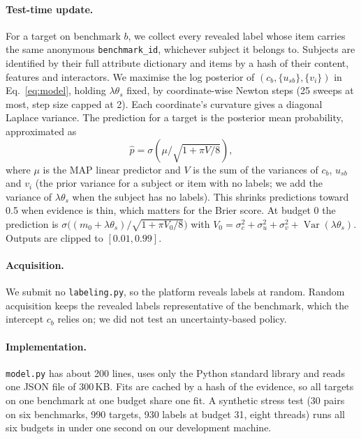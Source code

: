 \documentclass{article}
\begin{document}
\paragraph{Test-time update.} For a target on benchmark $b$, we collect every revealed label whose item carries the same anonymous \texttt{benchmark\_id}, whichever subject it belongs to. Subjects are identified by their full attribute dictionary and items by a hash of their content, features and interactors. We maximise the log posterior of $(c_b, \{u_{sb}\}, \{v_i\})$ in Eq.~\ref{eq:model}, holding $\lambda\theta_s$ fixed, by coordinate-wise Newton steps (25 sweeps at most, step size capped at 2). Each coordinate's curvature gives a diagonal Laplace variance. The prediction for a target is the posterior mean probability, approximated as
\begin{equation}
  \hat p = \sigma\!\left(\mu \big/ \sqrt{1 + \pi V/8}\right),
\end{equation}
where $\mu$ is the MAP linear predictor and $V$ is the sum of the variances of $c_b$, $u_{sb}$ and $v_i$ (the prior variance for a subject or item with no labels; we add the variance of $\lambda\theta_s$ when the subject has no labels). This shrinks predictions toward 0.5 when evidence is thin, which matters for the Brier score. At budget 0 the prediction is $\sigma\big((m_0 + \lambda\theta_s)/\sqrt{1+\pi V_0/8}\big)$ with $V_0 = \sigma_c^2 + \sigma_u^2 + \sigma_v^2 + \operatorname{Var}(\lambda\theta_s)$. Outputs are clipped to $[0.01, 0.99]$.

\paragraph{Acquisition.} We submit no \texttt{labeling.py}, so the platform reveals labels at random. Random acquisition keeps the revealed labels representative of the benchmark, which the intercept $c_b$ relies on; we did not test an uncertainty-based policy.

\paragraph{Implementation.} \texttt{model.py} has about 200 lines, uses only the Python standard library and reads one JSON file of 300\,KB. Fits are cached by a hash of the evidence, so all targets on one benchmark at one budget share one fit. A synthetic stress test (30 pairs on six benchmarks, 990 targets, 930 labels at budget 31, eight threads) runs all six budgets in under one second on our development machine.
\end{document}
